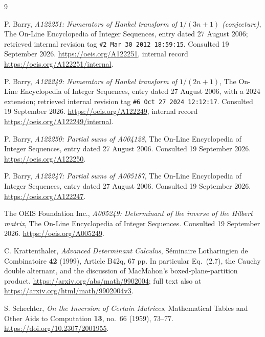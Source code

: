 \documentclass[11pt,a4paper]{article}
\numberwithin{equation}{section}
\theoremstyle{definition}
\theoremstyle{remark}
\begin{document}
\begin{thebibliography}{9}
P. Barry, \emph{A122251: Numerators of Hankel transform of $1/(3n+1)$ (conjecture)}, The On-Line Encyclopedia of Integer Sequences, entry dated 27 August 2006; retrieved internal revision tag \texttt{\#2 Mar 30 2012 18:59:15}. Consulted 19 September 2026. \url{https://oeis.org/A122251}, internal record \url{https://oeis.org/A122251/internal}.

P. Barry, \emph{A122249: Numerators of Hankel transform of $1/(2n+1)$}, The On-Line Encyclopedia of Integer Sequences, entry dated 27 August 2006, with a 2024 extension; retrieved internal revision tag \texttt{\#6 Oct 27 2024 12:12:17}. Consulted 19 September 2026. \url{https://oeis.org/A122249}, internal record \url{https://oeis.org/A122249/internal}.

P. Barry, \emph{A122250: Partial sums of A004128}, The On-Line Encyclopedia of Integer Sequences, entry dated 27 August 2006. Consulted 19 September 2026. \url{https://oeis.org/A122250}.

P. Barry, \emph{A122247: Partial sums of A005187}, The On-Line Encyclopedia of Integer Sequences, entry dated 27 August 2006. Consulted 19 September 2026. \url{https://oeis.org/A122247}.

The OEIS Foundation Inc., \emph{A005249: Determinant of the inverse of the Hilbert matrix}, The On-Line Encyclopedia of Integer Sequences. Consulted 19 September 2026. \url{https://oeis.org/A005249}.

C. Krattenthaler, \emph{Advanced Determinant Calculus}, S\'eminaire Lotharingien de Combinatoire \textbf{42} (1999), Article B42q, 67 pp. In particular Eq.~(2.7), the Cauchy double alternant, and the discussion of MacMahon's boxed-plane-partition product. \url{https://arxiv.org/abs/math/9902004}; full text also at \url{https://arxiv.org/html/math/9902004v3}.

S. Schechter, \emph{On the Inversion of Certain Matrices}, Mathematical Tables and Other Aids to Computation \textbf{13}, no.~66 (1959), 73--77. \url{https://doi.org/10.2307/2001955}.
\end{thebibliography}
\end{document}
